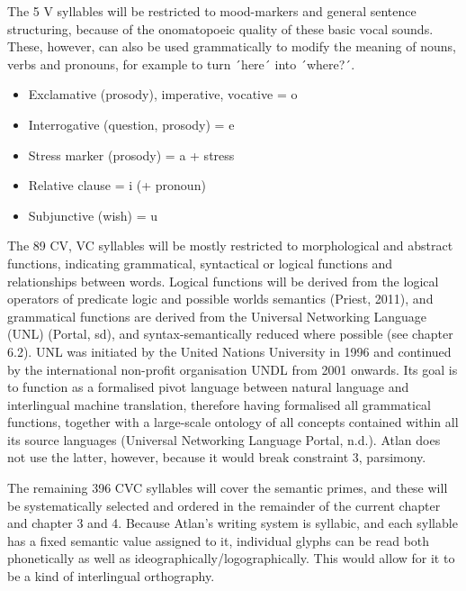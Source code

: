 The 5 V syllables will be restricted to mood-markers and general sentence structuring, because of the onomatopoeic quality of these basic vocal sounds. These, however, can also be used grammatically to modify the meaning of nouns, verbs and pronouns, for example to turn ´here´ into ´where?´.  
\begin{itemize}
\item    Exclamative (prosody), imperative, vocative = o  \Atlano

\item    Interrogative (question, prosody) = e  \Atlane

\item    Stress marker (prosody) = a + stress \Atlana

\item    Relative clause = i (+ pronoun) \Atlani

\item    Subjunctive (wish) = u \Atlanu
\end{itemize}

 

The 89 CV, VC syllables will be mostly restricted to morphological and abstract functions, indicating grammatical, syntactical or logical functions and relationships between words. Logical functions will be derived from the logical operators of predicate logic and possible worlds semantics (Priest, 2011), and grammatical functions are derived from the Universal Networking Language (UNL) (Portal, sd), and syntax-semantically reduced where possible (see chapter 6.2). UNL was initiated by the United Nations University in 1996 and continued by the international non-profit organisation UNDL from 2001 onwards. Its goal is to function as a formalised pivot language between natural language and interlingual machine translation, therefore having formalised all grammatical functions, together with a large-scale ontology of all concepts contained within all its source languages (Universal Networking Language Portal, n.d.). Atlan does not use the latter, however, because it would break constraint 3, parsimony. 	

The remaining 396 CVC syllables will cover the semantic primes, and these will be systematically selected and ordered in the remainder of the current chapter and chapter 3 and 4. Because Atlan’s writing system is syllabic, and each syllable has a fixed semantic value assigned to it, individual glyphs can be read both phonetically as well as ideographically/logographically. This would allow for it to be a kind of interlingual orthography. 

